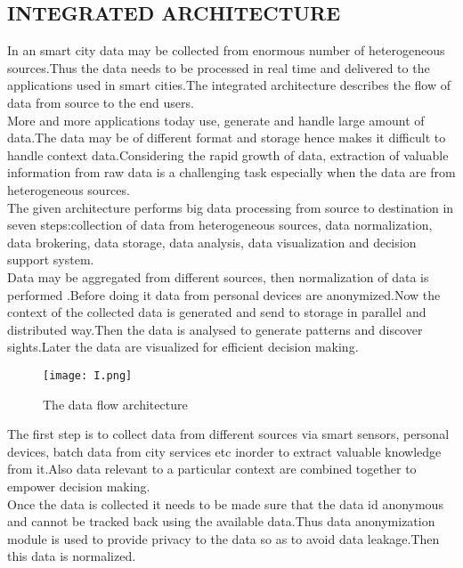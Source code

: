 \documentclass[10pt,a4paper,journal]{IEEEtran}
\begin{document}
\subsection{INTEGRATED ARCHITECTURE }

\hspace{2em}In an smart city data may be collected from enormous number of heterogeneous sources.Thus the data needs to be processed in real time and delivered to the applications used in smart cities.The integrated architecture describes the flow of data from source to the end users.\\
\hspace{2em}More and more applications today use, generate and handle large amount of data.The data may be of different format and storage hence makes it difficult to handle context data.Considering the rapid growth of data, extraction of valuable information from raw data is a challenging task especially when the data are from heterogeneous sources.\\
\hspace{2em}The given architecture\cite{8} performs big data processing from source to destination in seven steps:collection of data from heterogeneous sources, data normalization, data brokering, data storage, data analysis, data visualization and decision support system.\\
\hspace{2em}Data may be aggregated from different sources, then normalization of data is performed .Before doing it data from personal devices are anonymized.Now the context of the collected data is generated and send to storage in parallel and distributed way.Then the data is analysed to generate patterns and discover sights.Later the data are visualized for efficient decision making.\\
\begin{figure}[htbp]
\centering
\texttt{[image: I.png]}
\caption{The data flow architecture\cite{8}}
\label{2}
\end{figure}
\hspace{2em}The first step is to collect data from different sources via smart sensors, personal devices, batch data from city services etc inorder to extract valuable knowledge from it.Also data relevant to a particular context are combined together to empower decision making.\\
\hspace{2em}Once the data is collected it needs to be made sure that the data id anonymous and cannot be tracked back using the available data.Thus data anonymization module is used to provide privacy to the data so as to avoid data leakage.Then this data is normalized.\\
\end{document}
